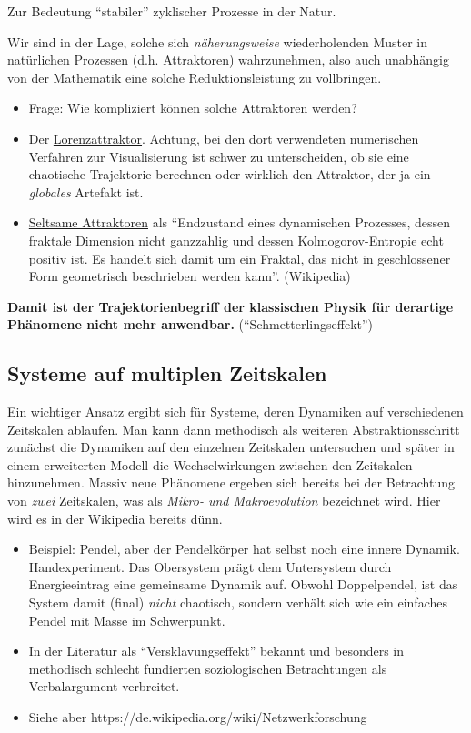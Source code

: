 \documentclass[11pt,a4paper]{article}
\begin{document}
Zur Bedeutung ``stabiler'' zyklischer Prozesse in der Natur.

Wir sind in der Lage, solche sich \emph{näherungsweise} wiederholenden
Muster in natürlichen Prozessen (d.h. Attraktoren) wahrzunehmen, also
auch unabhängig von der Mathematik eine solche Reduktionsleistung zu
vollbringen.

\begin{itemize}
[noitemsep]
\item
  Frage: Wie kompliziert können solche Attraktoren werden?
\item
  Der
  \href{https://de.wikipedia.org/wiki/Lorenz-Attraktor}{Lorenzattraktor}.
  Achtung, bei den dort verwendeten numerischen Verfahren zur
  Visualisierung ist schwer zu unterscheiden, ob sie eine chaotische
  Trajektorie berechnen oder wirklich den Attraktor, der ja ein
  \emph{globales} Artefakt ist.
\item
  \href{https://de.wikipedia.org/wiki/Seltsamer_Attraktor}{Seltsame
  Attraktoren} als ``Endzustand eines dynamischen Prozesses, dessen
  fraktale Dimension nicht ganzzahlig und dessen Kolmogorov-Entropie
  echt positiv ist. Es handelt sich damit um ein Fraktal, das nicht in
  geschlossener Form geometrisch beschrieben werden kann''. (Wikipedia)
\end{itemize}

\textbf{Damit ist der Trajektorienbegriff der klassischen Physik für
derartige Phänomene nicht mehr anwendbar.} (``Schmetterlingseffekt'')

\hypertarget{systeme-auf-multiplen-zeitskalen}{%
\subsection{Systeme auf multiplen
Zeitskalen}\label{systeme-auf-multiplen-zeitskalen}}

Ein wichtiger Ansatz ergibt sich für Systeme, deren Dynamiken auf
verschiedenen Zeitskalen ablaufen. Man kann dann methodisch als weiteren
Abstraktionsschritt zunächst die Dynamiken auf den einzelnen Zeitskalen
untersuchen und später in einem erweiterten Modell die Wechselwirkungen
zwischen den Zeitskalen hinzunehmen. Massiv neue Phänomene ergeben sich
bereits bei der Betrachtung von \emph{zwei} Zeitskalen, was als
\emph{Mikro- und Makroevolution} bezeichnet wird. Hier wird es in der
Wikipedia bereits dünn.

\begin{itemize}
[noitemsep]
\item
  Beispiel: Pendel, aber der Pendelkörper hat selbst noch eine innere
  Dynamik. Handexperiment. Das Obersystem prägt dem Untersystem durch
  Energieeintrag eine gemeinsame Dynamik auf. Obwohl Doppelpendel, ist
  das System damit (final) \emph{nicht} chaotisch, sondern verhält sich
  wie ein einfaches Pendel mit Masse im Schwerpunkt.
\item
  In der Literatur als ``Versklavungseffekt'' bekannt und besonders in
  methodisch schlecht fundierten soziologischen Betrachtungen als
  Verbalargument verbreitet.
\item
  Siehe aber https://de.wikipedia.org/wiki/Netzwerkforschung
\end{itemize}
\end{document}
